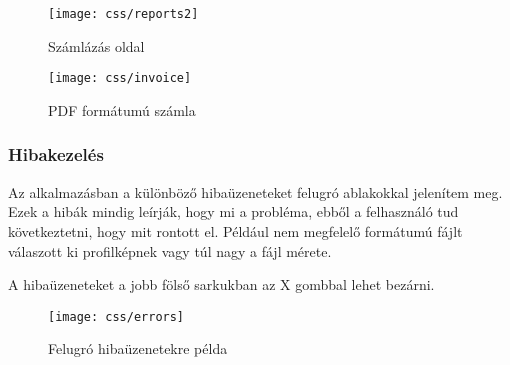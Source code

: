 \begin{figure}[H]
    \centering
    \texttt{[image: css/reports2]}
    \caption{Számlázás oldal}
\end{figure}

\begin{figure}[H]
    \centering
    \texttt{[image: css/invoice]}
    \caption{PDF formátumú számla}
\end{figure}

\subsubsection{Hibakezelés}

Az alkalmazásban a különböző hibaüzeneteket felugró ablakokkal jelenítem meg. Ezek a hibák mindig leírják, hogy mi a probléma, ebből a felhasználó tud következtetni, hogy mit rontott el. Például nem megfelelő formátumú fájlt válaszott ki profilképnek vagy túl nagy a fájl mérete.

A hibaüzeneteket a jobb fölső sarkukban az X gombbal lehet bezárni.

\begin{figure}[H]
    \centering
    \texttt{[image: css/errors]}
    \caption{Felugró hibaüzenetekre példa}
\end{figure}


















